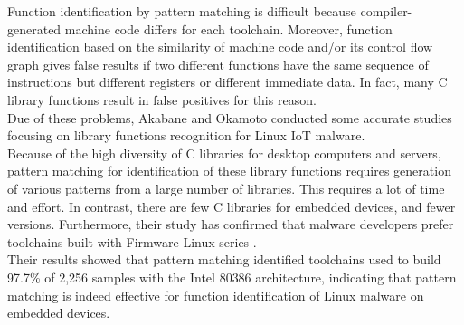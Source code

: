\noindent Function identification by pattern matching is difficult because compiler-generated machine code differs for each toolchain. Moreover, function identification based on the similarity of machine code and/or its control flow graph gives false results if two different functions have the same sequence of instructions but different registers or different immediate data. In fact, many C library functions result in false positives for this reason. \\
Due of these problems, Akabane and Okamoto conducted some accurate studies \cite{akabane2020identification}\cite{akabane2021identification} focusing on library functions recognition for Linux IoT malware. \\
Because of the high diversity of C libraries for desktop computers and servers, pattern matching for identification of these library functions requires generation of various patterns from a large number of libraries. This requires a lot of time and effort. In contrast, there are few C libraries for embedded devices, and fewer versions. Furthermore, their study has confirmed that malware developers prefer toolchains built with Firmware Linux series \cite{landley2002firmware}. \\
Their results showed that pattern matching identified toolchains used to build 97.7\% of 2,256 samples with the Intel 80386 architecture, indicating that pattern matching is indeed effective for function identification of Linux malware on embedded devices.
